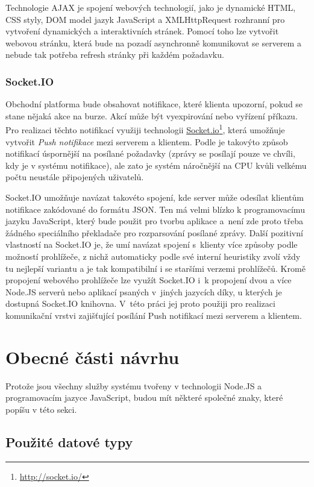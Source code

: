 \documentclass[thesis=M,czech]{FITthesis}[2012/06/26]
\newcommand\fnurl[2]{\href{#2}{#1}\footnote{\url{#2}}}
\begin{document}
	Technologie AJAX je spojení webových technologií, jako je dynamické HTML, CSS styly, DOM model jazyk JavaScript a XMLHttpRequest rozhranní pro vytvoření dynamických a interaktivních stránek. Pomocí toho lze vytvořit webovou stránku, která bude na pozadí asynchronně komunikovat se serverem a nebude tak potřeba refresh stránky při každém požadavku.
	
\subsubsection{Socket.IO}
\label{sec:socket_io}
	Obchodní platforma bude obsahovat notifikace, které klienta upozorní, pokud se stane nějaká akce na burze. Akcí může být vyexpirování nebo vyřízení příkazu. Pro realizaci těchto notifikací využiji technologii \fnurl{Socket.io}{http://socket.io/}, která umožňuje vytvořit \textit{Push notifikace} mezi serverem a klientem. Podle \cite{PushPull} je takovýto způsob notifikací úspornější na posílané požadavky (zprávy se posílají pouze ve chvíli, kdy je v systému notifikace), ale zato je systém náročnější na CPU kvůli velkému počtu neustále připojených uživatelů.
	
	Socket.IO umožňuje navázat takovéto spojení, kde server může odesílat klientům notifikace zakódované do formátu JSON. Ten má velmi blízko k programovacímu jazyku JavaScript, který bude použit pro tvorbu aplikace a~není zde proto třeba žádného speciálního překladače pro rozparsování posílané zprávy. Další pozitivní vlastností na Socket.IO je, že umí navázat spojení s~klienty více způsoby podle možností prohlížeče, z nichž automaticky podle své interní heuristiky zvolí vždy tu nejlepší variantu a je tak kompatibilní i se staršími verzemi prohlížečů. Kromě propojení webového prohlížeče lze využít Socket.IO i~k propojení dvou a více Node.JS serverů nebo aplikací psaných v~jiných jazycích díky, u kterých je dostupná Socket.IO knihovna. V~této práci jej proto použiji pro realizaci komunikační vrstvi zajišťující posílání Push notifikací mezi serverem a klientem.
	
\section{Obecné části návrhu}
\label{sec:design_basics}
	
	Protože jsou všechny služby systému tvořeny v technologii Node.JS a programovacím jazyce JavaScript, budou mít některé společné znaky, které popíšu v této sekci.
	
\subsection{Použité datové typy}
	
\end{document}
